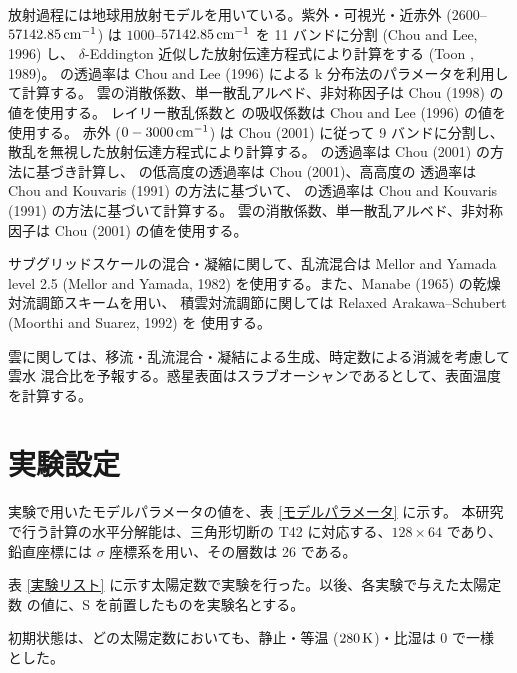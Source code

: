 \documentclass[body]{subfiles}
\begin{document}
放射過程には地球用放射モデルを用いている。紫外・可視光・近赤外 (\(2600\)--\(57142.85\hmu{cm^{-1}}\))
は \(1000\)--\(57142.85\hmu{cm^{-1}}\) を 11 バンドに分割 (Chou and Lee, 1996) し、
\(\delta\)-Eddington 近似した放射伝達方程式により計算をする (Toon \etal*, 1989)。
 の透過率は Chou and Lee (1996) による k 分布法のパラメータを利用して計算する。
雲の消散係数、単一散乱アルベド、非対称因子は Chou \etal (1998) の値を使用する。
レイリー散乱係数と  の吸収係数は Chou and Lee (1996) の値を使用する。
赤外 (\(0-3000\hmu{cm^{-1}}\)) は Chou \etal (2001) に従って 9 バンドに分割し、
散乱を無視した放射伝達方程式により計算する。 の透過率は Chou \etal (2001)
の方法に基づき計算し、 の低高度の透過率は Chou \etal (2001)、高高度の
透過率は Chou and Kouvaris (1991) の方法に基づいて、 の透過率は
Chou and Kouvaris (1991) の方法に基づいて計算する。
雲の消散係数、単一散乱アルベド、非対称因子は Chou \etal (2001) の値を使用する。

サブグリッドスケールの混合・凝縮に関して、乱流混合は Mellor and Yamada level 2.5
(Mellor and Yamada, 1982) を使用する。また、Manabe \etal (1965) の乾燥対流調節スキームを用い、
積雲対流調節に関しては Relaxed Arakawa--Schubert (Moorthi and Suarez, 1992) を
使用する。

雲に関しては、移流・乱流混合・凝結による生成、時定数による消滅を考慮して雲水
混合比を予報する。惑星表面はスラブオーシャンであるとして、表面温度を計算する。

\section{実験設定}

実験で用いたモデルパラメータの値を、表 \ref{モデルパラメータ} に示す。
本研究で行う計算の水平分解能は、三角形切断の T42 に対応する、\(128\times64\)
であり、鉛直座標には \(\sigma\) 座標系を用い、その層数は 26 である。

表 \ref{実験リスト} に示す太陽定数で実験を行った。以後、各実験で与えた太陽定数
の値に、S を前置したものを実験名とする。

初期状態は、どの太陽定数においても、静止・等温 (\(280\hmu{K}\))・比湿は 0 で一様
とした。
\end{document}
